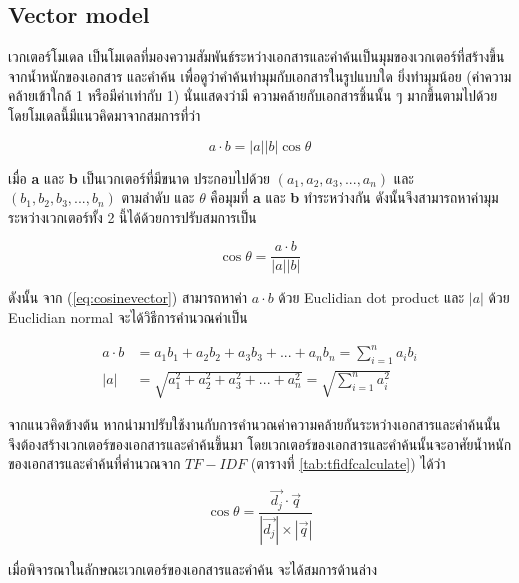 \documentclass[11pt,a4paper]{article}
\begin{document}
{{{\newpage

\subsection{Vector model}

เวกเตอร์โมเดล เป็นโมเดลที่มองความสัมพันธ์ระหว่างเอกสารและคำค้นเป็นมุมของเวกเตอร์ที่สร้างขึ้นจากน้ำหนักของเอกสาร
และคำค้น เพื่อดูว่าคำค้นทำมุมกับเอกสารในรูปแบบใด ยิ่งทำมุมน้อย (ค่าความคล้ายเข้าใกล้ 1 หรือมีค่าเท่ากับ 1) นั่นแสดงว่ามี
ความคล้ายกับเอกสารชิ้นนั้น ๆ มากขึ้นตามไปด้วย โดยโมเดลนี้มีแนวคิดมาจากสมการที่ว่า

\begin{equation*}
    a \cdot b = |a||b| \cos \theta
\end{equation*}

เมื่อ {\bf a} และ {\bf b} เป็นเวกเตอร์ที่มีขนาด ประกอบไปด้วย $(a_1, a_2, a_3, ..., a_n)$ 
และ $(b_1, b_2, b_3, ..., b_n)$ ตามลำดับ และ $\theta$ คือมุมที่ {\bf a} และ {\bf b} ทำระหว่างกัน
ดังนั้นจึงสามารถหาค่ามุมระหว่างเวกเตอร์ทั้ง 2 นี้ได้ด้วยการปรับสมการเป็น

\begin{equation}
    \cos \theta = \frac{a \cdot b}{|a||b|} 
    \label{eq:cosinevector}
\end{equation}


ดังนั้น จาก (\ref{eq:cosinevector}) สามารถหาค่า $a \cdot b$ ด้วย Euclidian dot product และ $|a|$ ด้วย 
Euclidian normal จะได้วิธีการคำนวณค่าเป็น 

\begin{align*}
    a \cdot b   & = a_1 b_1 +  a_2 b_2 + a_3 b_3 + ... + a_n b_n = \sum_{i=1}^n a_i b_i \\
    |a|         & = \sqrt{a_1^2 + a_2^2 + a_3^2 + ... + a_n^2} = \sqrt{\sum_{i=1}^n a_i^2}
\end{align*}

จากแนวคิดข้างต้น หากนำมาปรับใช้งานกับการคำนวณค่าความคล้ายกันระหว่างเอกสารและคำค้นนั้น จึงต้องสร้างเวกเตอร์ของเอกสารและคำค้นขึ้นมา
โดยเวกเตอร์ของเอกสารและคำค้นนั้นจะอาศัยน้ำหนักของเอกสารและคำค้นที่คำนวณจาก $TF-IDF$ (ตารางที่ \ref{tab:tfidfcalculate}) ได้ว่า

\begin{equation*}
    \cos \theta = \frac{\overrightarrow{d_j} \cdot {\overrightarrow{q}}}{|\overrightarrow{d_j}| \times |\overrightarrow{q}|}
    \label{eq:coseq}
\end{equation*}

เมื่อพิจารณาในลักษณะเวกเตอร์ของเอกสารและคำค้น จะได้สมการด้านล่าง

}}}
\end{document}

